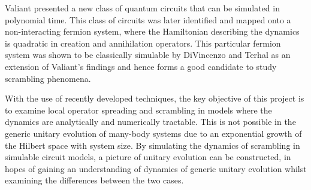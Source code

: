 Valiant \cite{Valiant2001QuantumCT} presented a new class of quantum circuits that can be simulated in
polynomial time. This class of circuits was later identified and mapped onto a non-interacting fermion system, where the Hamiltonian
describing the dynamics is quadratic in creation and annihilation operators. This particular fermion
system was shown to be classically simulable by DiVincenzo and Terhal \cite{Terhal2001} as an extension of Valiant's findings and
hence forms a good candidate to study scrambling phenomena.

With the use of recently developed techniques, the key objective of this project is to examine local
operator spreading and scrambling in models where the dynamics are analytically and numerically tractable. This is not
possible in the generic unitary evolution of many-body systems due to an exponential growth of
the Hilbert space with system size. By simulating the dynamics of scrambling in simulable circuit models, a picture of unitary evolution
can be constructed, in hopes of gaining an understanding of dynamics of generic unitary evolution
whilst examining the differences between the two cases.



